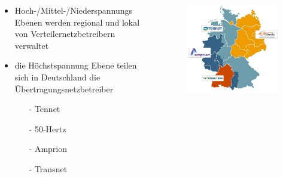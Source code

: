 \documentclass[aspectratio=1610, professionalfonts, 9pt]{beamer}
\begin{document}
\begin{frame}
  \begin{columns}
  \begin{column}{0.5\textwidth}
  \begin{itemize}
    \item Hoch-/Mittel-/Niederspannungs Ebenen
     werden regional und lokal von Verteilernetzbetreibern verwaltet
    \item die Höchstspannung Ebene teilen sich in
    Deutschland die Übertragungsnetzbetreiber
    \begin{itemize}
      \item[-] Tennet
      \item[-] 50-Hertz
      \item[-] Amprion
      \item[-] Transnet
  \end{itemize}
\end{itemize}
\end{column}
\begin{column}{0.5\textwidth}
\begin{figure}
    \includegraphics[width=1.1\textwidth]{images/UNB.jpg}
\end{figure}
\end{column}
\end{columns}
\end{frame}
\end{document}

